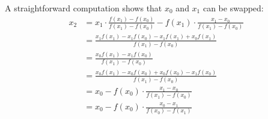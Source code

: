 \documentclass{homework}
\begin{document}
A straightforward computation shows that $x_0$ and $x_1$ can be swapped:
\begin{align*}
    x_2 &= x_1 \cdot \frac{f(x_1) - f(x_0)}{f(x_1) - f(x_0)} - f(x_1) \cdot 
        \frac{x_1 - x_0}{f(x_1) - f(x_0)} \\
        &= \frac{x_1 f(x_1) - x_1 f(x_0) - x_1 f(x_1) + x_0 f(x_1)}{f(x_1) - f(x_0)} \\
        &= \frac{x_0 f(x_1) - x_1 f(x_0)}{f(x_1) - f(x_0)} \\
        &= \frac{x_0 f(x_1) - x_0 f(x_0) + x_0 f(x_0) - x_1 f(x_0)}{f(x_1) - f(x_0)} \\
        &= x_0 - f(x_0) \cdot \frac{x_1 - x_0}{f(x_1) - f(x_0)} \\
        &= x_0 - f(x_0) \cdot \frac{x_0 - x_1}{f(x_0) - f(x_1)}
\end{align*}
\end{document}
